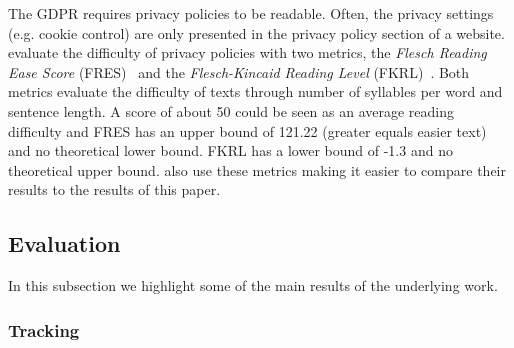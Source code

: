 The GDPR requires privacy policies to be readable. Often, the privacy settings (e.g. cookie control) are only presented
in the privacy policy section of a website. \citeauthor{sanchez2019can} evaluate the difficulty of privacy policies with
two metrics, the \emph{Flesch Reading Ease Score} (FRES)~\cite{flesch1948new} and the \emph{Flesch-Kincaid Reading
Level} (FKRL)~\cite{kincaid1975derivation}. Both metrics evaluate the difficulty of texts through number of syllables
per word and sentence length. A score of about 50 could be seen as an average reading difficulty and FRES has an upper
bound of 121.22 (greater equals easier text) and no theoretical lower bound. FKRL has a lower bound of -1.3 and no
theoretical upper bound.  also use these metrics making it easier to compare their results to the
results of this paper.

\subsection{Evaluation}

In this subsection we highlight some of the main results of the underlying work.

\subsubsection{Tracking}

